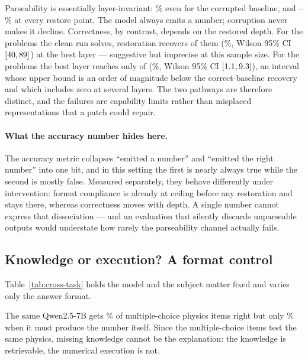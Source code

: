 \documentclass[10pt,letterpaper]{article}
\begin{document}
Parseability is essentially layer-invariant: \pctParseCorrupt\% even for the
corrupted baseline, and \pctParseMin--\pctParseMax\% at every restore point. The
model always emits a number; corruption never makes it decline. Correctness, by
contrast, depends on the restored depth. For the \nbCleanCorrect{} problems the
clean run solves, restoration recovers \nbCleanCorrectK{} of them
(\pctAccCleanCorrectBest\%, Wilson 95\% CI $[40, 89]$) at the best
layer --- suggestive but imprecise at this sample size. For the \nbCleanWrong{}
problems the best layer reaches only \nbCleanWrongK{} of \nbCleanWrong{}
(\pctAccCleanWrongBest\%, Wilson 95\% CI $[1.1, 9.3]$), an interval
whose upper bound is an order of magnitude below the correct-baseline recovery and
which includes zero at several layers. The two pathways are therefore distinct, and
the failures are capability limits rather than misplaced representations that a
patch could repair.

\paragraph{What the accuracy number hides here.}
The accuracy metric collapses ``emitted a number'' and ``emitted the right number''
into one bit, and in this setting the first is nearly always true while the second
is mostly false. Measured separately, they behave differently under intervention:
format compliance is already at ceiling before any restoration and stays there,
whereas correctness moves with depth. A single number cannot express that
dissociation --- and an evaluation that silently discards unparseable outputs would
understate how rarely the parseability channel actually fails.

\subsection{Knowledge or execution? A format control}
\label{sec:cross}
Table~\ref{tab:cross-task} holds the model and the subject matter fixed and varies
only the answer format.



The same Qwen2.5-7B gets \accMMLU\% of \nbMMLU{} multiple-choice physics items
right but only \accCotSevenB\% when it must produce the number itself. Since the
multiple-choice items test the same physics, missing knowledge cannot be the
explanation: the knowledge is retrievable, the numerical execution is not.
\end{document}
